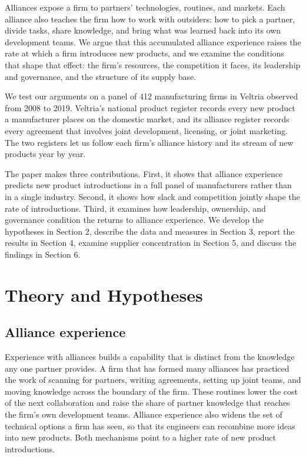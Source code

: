 \documentclass[12pt]{article}
\begin{document}
Alliances expose a firm to partners' technologies, routines, and markets. Each alliance also teaches the firm how to work with outsiders: how to pick a partner, divide tasks, share knowledge, and bring what was learned back into its own development teams. We argue that this accumulated alliance experience raises the rate at which a firm introduces new products, and we examine the conditions that shape that effect: the firm's resources, the competition it faces, its leadership and governance, and the structure of its supply base.

We test our arguments on a panel of 412 manufacturing firms in Veltria observed from 2008 to 2019. Veltria's national product register records every new product a manufacturer places on the domestic market, and its alliance register records every agreement that involves joint development, licensing, or joint marketing. The two registers let us follow each firm's alliance history and its stream of new products year by year.

The paper makes three contributions. First, it shows that alliance experience predicts new product introductions in a full panel of manufacturers rather than in a single industry. Second, it shows how slack and competition jointly shape the rate of introductions. Third, it examines how leadership, ownership, and governance condition the returns to alliance experience. We develop the hypotheses in Section 2, describe the data and measures in Section 3, report the results in Section 4, examine supplier concentration in Section 5, and discuss the findings in Section 6.

\section{Theory and Hypotheses}

\subsection{Alliance experience}

Experience with alliances builds a capability that is distinct from the knowledge any one partner provides. A firm that has formed many alliances has practiced the work of scanning for partners, writing agreements, setting up joint teams, and moving knowledge across the boundary of the firm. These routines lower the cost of the next collaboration and raise the share of partner knowledge that reaches the firm's own development teams. Alliance experience also widens the set of technical options a firm has seen, so that its engineers can recombine more ideas into new products. Both mechanisms point to a higher rate of new product introductions.
\end{document}
